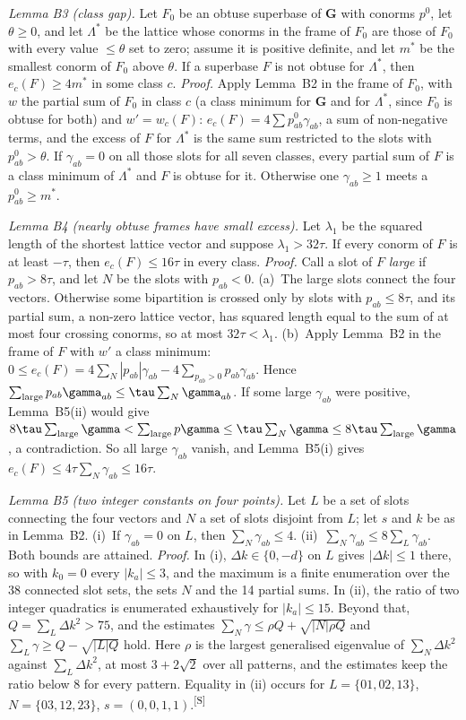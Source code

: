 \documentclass[preprint,pdf]{iucr}          %
\makeatletter
\newcommand{\Gmet}{\mathbf{G}}
\newcommand{\chk}[1]{\textsuperscript{[S\@nameuse{zn@#1}]}}
\makeatother
\begin{document}
\emph{Lemma B3 (class gap).} Let $F_0$ be an obtuse superbase of $\Gmet$ with conorms $p^0$, let $\theta\ge0$, and let $\Lambda^*$ be the lattice whose conorms in the frame of $F_0$ are those of $F_0$ with every value $\le\theta$ set to zero; assume it is positive definite, and let $m^*$ be the smallest conorm of $F_0$ above $\theta$. If a superbase $F$ is not obtuse for $\Lambda^*$, then $e_c(F)\ge4m^*$ in some class $c$. \emph{Proof.} Apply Lemma~B2 in the frame of $F_0$, with $w$ the partial sum of $F_0$ in class $c$ (a class minimum for $\Gmet$ and for $\Lambda^*$, since $F_0$ is obtuse for both) and $w'=w_c(F)$: $e_c(F)=4\sum p^0_{ab}\gamma_{ab}$, a sum of non-negative terms, and the excess of $F$ for $\Lambda^*$ is the same sum restricted to the slots with $p^0_{ab}>\theta$. If $\gamma_{ab}=0$ on all those slots for all seven classes, every partial sum of $F$ is a class minimum of $\Lambda^*$ and $F$ is obtuse for it. Otherwise one $\gamma_{ab}\ge1$ meets a $p^0_{ab}\ge m^*$.

\emph{Lemma B4 (nearly obtuse frames have small excess).} Let $\lambda_1$ be the squared length of the shortest lattice vector and suppose $\lambda_1>32\tau$. If every conorm of $F$ is at least $-\tau$, then $e_c(F)\le16\tau$ in every class. \emph{Proof.} Call a slot of $F$ \emph{large} if $p_{ab}>8\tau$, and let $N$ be the slots with $p_{ab}<0$. (a)~The large slots connect the four vectors. Otherwise some bipartition is crossed only by slots with $p_{ab}\le8\tau$, and its partial sum, a non-zero lattice vector, has squared length equal to the sum of at most four crossing conorms, so at most $32\tau<\lambda_1$. (b)~Apply Lemma~B2 in the frame of $F$ with $w'$ a class minimum: $0\le e_c(F)=4\sum_N|p_{ab}|\gamma_{ab}-4\sum_{p_{ab}>0}p_{ab}\gamma_{ab}$. Hence $\sum_{\rm large}p_{ab}\gamma_{ab}\le\tau\sum_N\gamma_{ab}$. If some large $\gamma_{ab}$ were positive, Lemma~B5(ii) would give $8\tau\sum_{\rm large}\gamma<\sum_{\rm large}p\gamma\le\tau\sum_N\gamma\le8\tau\sum_{\rm large}\gamma$, a contradiction. So all large $\gamma_{ab}$ vanish, and Lemma~B5(i) gives $e_c(F)\le4\tau\sum_N\gamma_{ab}\le16\tau$.

\emph{Lemma B5 (two integer constants on four points).} Let $L$ be a set of slots connecting the four vectors and $N$ a set of slots disjoint from $L$; let $s$ and $k$ be as in Lemma~B2. (i)~If $\gamma_{ab}=0$ on $L$, then $\sum_N\gamma_{ab}\le4$. (ii)~$\sum_N\gamma_{ab}\le8\sum_L\gamma_{ab}$. Both bounds are attained. \emph{Proof.} In (i), $\Delta k\in\{0,-d\}$ on $L$ gives $|\Delta k|\le1$ there, so with $k_0=0$ every $|k_a|\le3$, and the maximum is a finite enumeration over the 38 connected slot sets, the sets $N$ and the 14 partial sums. In (ii), the ratio of two integer quadratics is enumerated exhaustively for $|k_a|\le15$. Beyond that, $Q=\sum_L\Delta k^2>75$, and the estimates $\sum_N\gamma\le\rho Q+\sqrt{|N|\rho Q}$ and $\sum_L\gamma\ge Q-\sqrt{|L|Q}$ hold. Here $\rho$ is the largest generalised eigenvalue of $\sum_N\Delta k^2$ against $\sum_L\Delta k^2$, at most $3+2\sqrt2$ over all patterns, and the estimates keep the ratio below $8$ for every pattern. Equality in (ii) occurs for $L=\{01,02,13\}$, $N=\{03,12,23\}$, $s=(0,0,1,1)$.\chk{z:widened-complete}
\end{document}

